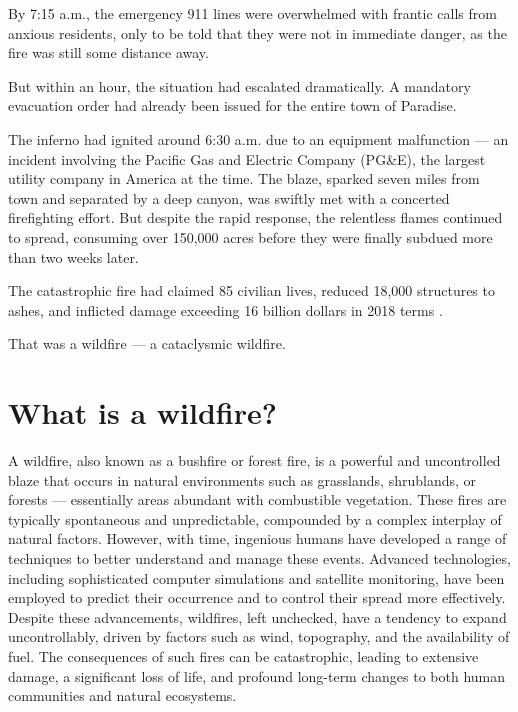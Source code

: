 \documentclass[
  12 pt,
]{Nemilov}
\begin{document}
By 7:15 a.m., the emergency 911 lines were overwhelmed with frantic calls from anxious residents, only to be told that they were not in immediate danger, as the fire was still some distance away.

But within an hour, the situation had escalated dramatically. A mandatory evacuation order had already been issued for the entire town of Paradise.

The inferno had ignited around 6:30 a.m. due to an equipment malfunction --- an incident involving the Pacific Gas and Electric Company (PG\&E), the largest utility company in America at the time. The blaze, sparked seven miles from town and separated by a deep canyon, was swiftly met with a concerted firefighting effort. But despite the rapid response, the relentless flames continued to spread, consuming over 150,000 acres before they were finally subdued more than two weeks later.

The catastrophic fire had claimed 85 civilian lives, reduced 18,000 structures to ashes, and inflicted damage exceeding 16 billion dollars in 2018 terms \citep{johnson2022paradise}.

That was a wildfire --- a cataclysmic wildfire.

\section{What is a wildfire?}\label{what-is-a-wildfire}

A wildfire, also known as a bushfire or forest fire, is a powerful and uncontrolled blaze that occurs in natural environments such as grasslands, shrublands, or forests --- essentially areas abundant with combustible vegetation. These fires are typically spontaneous and unpredictable, compounded by a complex interplay of natural factors. However, with time, ingenious humans have developed a range of techniques to better understand and manage these events. Advanced technologies, including sophisticated computer simulations and satellite monitoring, have been employed to predict their occurrence and to control their spread more effectively. Despite these advancements, wildfires, left unchecked, have a tendency to expand uncontrollably, driven by factors such as wind, topography, and the availability of fuel. The consequences of such fires can be catastrophic, leading to extensive damage, a significant loss of life, and profound long-term changes to both human communities and natural ecosystems.
\end{document}
